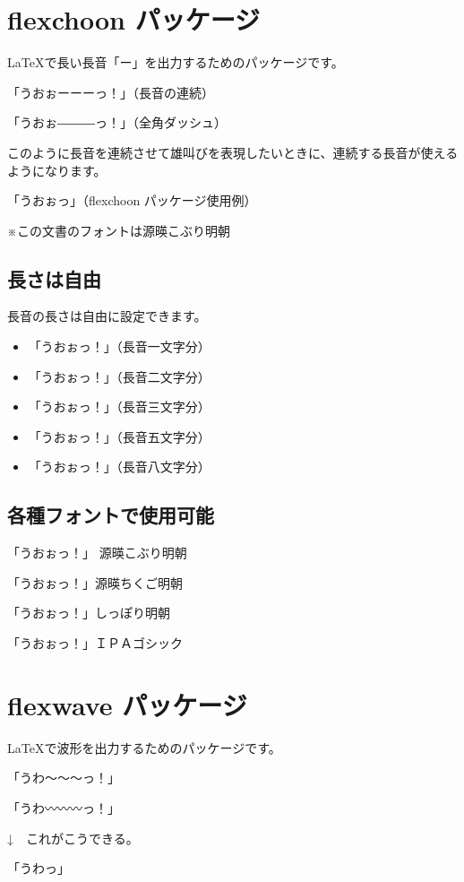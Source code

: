\documentclass[tate,
book,
paper=a6paper, %
onecolumn, %
fontsize=9pt, %
baselineskip=1.618zw, %
hanging_punctuation %
]{jlreq}
\begin{document}
\section{flexchoon パッケージ}

\LaTeX で長い長音「ー」を出力するためのパッケージです。

\vspace{0.5\baselineskip}

「うおぉーーーっ！」（長音の連続）

「うおぉ―――っ！」（全角ダッシュ）

このように長音を連続させて雄叫びを表現したいときに、連続する長音が使えるようになります。

「うおぉっ」（flexchoon パッケージ使用例）

{\footnotesize ※この文書のフォントは源暎こぶり明朝}

\vspace{0.5\baselineskip}

\subsection{長さは自由}

長音の長さは自由に設定できます。

\begin{itemize}
    \item 「うおぉっ！」（長音一文字分）
    \item 「うおぉっ！」（長音二文字分）
    \item 「うおぉっ！」（長音三文字分）
    \item 「うおぉっ！」（長音五文字分）
    \item 「うおぉっ！」（長音八文字分）
\end{itemize}

\subsection{各種フォントで使用可能}

{\fontKoburi「うおぉっ！」 源暎こぶり明朝}

{\fontChikugo「うおぉっ！」源暎ちくご明朝}

{\fontShippori「うおぉっ！」しっぽり明朝}

{\fontIPA「うおぉっ！」ＩＰＡゴシック}

\section{flexwave パッケージ}

\LaTeX で波形を出力するためのパッケージです。

「うわ〜〜〜っ！」

「うわ〰〰〰っ！」

↓　これがこうできる。

「うわっ」
\end{document}
